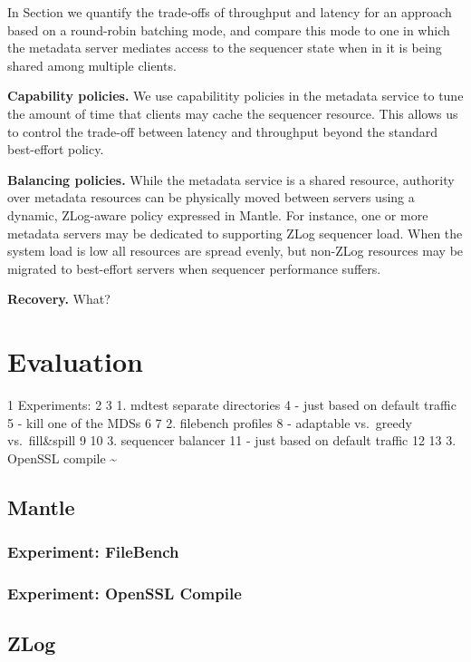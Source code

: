 \documentclass[10pt,twocolumn]{article}
\begin{document}
In Section we quantify the trade-offs of throughput and latency for an
approach based on a round-robin batching mode, and compare this mode to one in
which the metadata server mediates access to the sequencer state when in it is
being shared among multiple clients.

{\bf Capability policies.}
We use capabilitity policies in the metadata service to tune the amount of
time that clients may cache the sequencer resource. This allows us to control
the trade-off between latency and throughput beyond the standard best-effort
policy.

{\bf Balancing policies.}
While the metadata service is a shared resource, authority over metadata
resources can be physically moved between servers using a dynamic, ZLog-aware
policy expressed in Mantle. For instance, one or more metadata servers may be
dedicated to supporting ZLog sequencer load. When the system load is low all
resources are spread evenly, but non-ZLog resources may be migrated to
best-effort servers when sequencer performance suffers.

{\bf Recovery.}
What?

\section{Evaluation}\label{evaluation}

1 Experiments: 2 3 1. mdtest separate directories 4 - just based on
default traffic 5 - kill one of the MDSs 6 7 2. filebench profiles 8 -
adaptable vs.~greedy vs.~fill\&spill 9 10 3. sequencer balancer 11 -
just based on default traffic 12 13 3. OpenSSL compile
\textasciitilde{}\\\label{evaluation}

\subsection{Mantle}\label{mantle}

\subsubsection{Experiment: FileBench}\label{experiment-filebench}

\subsubsection{Experiment: OpenSSL
Compile}\label{experiment-openssl-compile}

\subsection{ZLog}
\end{document}
